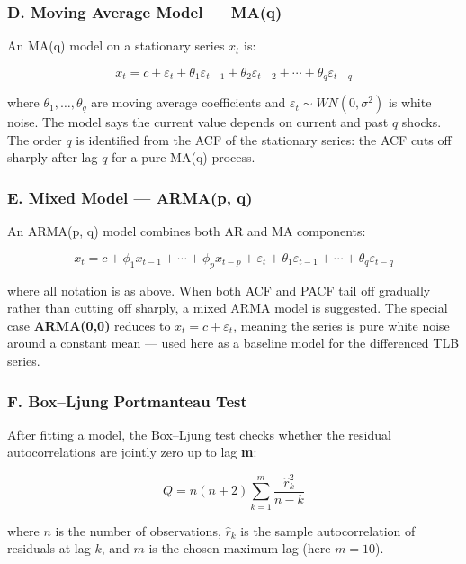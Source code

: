 \documentclass[
]{article}
\begin{document}
\subsubsection{D. Moving Average Model ---
MA(q)}\label{d.-moving-average-model-maq}

An MA(q) model on a stationary series \(x_t\) is:

\[
x_t = c + \varepsilon_t + \theta_1 \varepsilon_{t-1} + \theta_2 \varepsilon_{t-2} + \cdots + \theta_q \varepsilon_{t-q}
\]

where \(\theta_1, \ldots, \theta_q\) are moving average coefficients and
\(\varepsilon_t \sim WN(0, \sigma^2)\) is white noise. The model says
the current value depends on current and past \(q\) shocks. The order
\(q\) is identified from the ACF of the stationary series: the ACF cuts
off sharply after lag \(q\) for a pure MA(q) process.

\subsubsection{E. Mixed Model --- ARMA(p,
q)}\label{e.-mixed-model-armap-q}

An ARMA(p, q) model combines both AR and MA components:

\[
x_t = c + \phi_1 x_{t-1} + \cdots + \phi_p x_{t-p} + \varepsilon_t + \theta_1 \varepsilon_{t-1} + \cdots + \theta_q \varepsilon_{t-q}
\]

where all notation is as above. When both ACF and PACF tail off
gradually rather than cutting off sharply, a mixed ARMA model is
suggested. The special case \textbf{ARMA(0,0)} reduces to
\(x_t = c + \varepsilon_t\), meaning the series is pure white noise
around a constant mean --- used here as a baseline model for the
differenced TLB series.

\subsubsection{F. Box--Ljung Portmanteau
Test}\label{f.-boxljung-portmanteau-test}

After fitting a model, the Box--Ljung test checks whether the residual
autocorrelations are jointly zero up to lag \textbf{m}:

\[
Q = n(n+2)\sum_{k=1}^{m} \frac{\hat{r}_k^2}{n-k}
\]

where \(n\) is the number of observations, \(\hat{r}_k\) is the sample
autocorrelation of residuals at lag \(k\), and \(m\) is the chosen
maximum lag (here \(m = 10\)).
\end{document}
